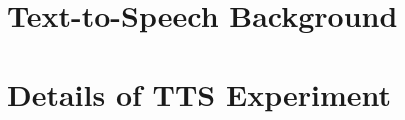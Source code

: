 \documentclass{article}
\begin{document}
\appendix 

\section{Text-to-Speech Background}


\section{Details of TTS Experiment}
\label{appendix:tts_experiment}

\end{document}
